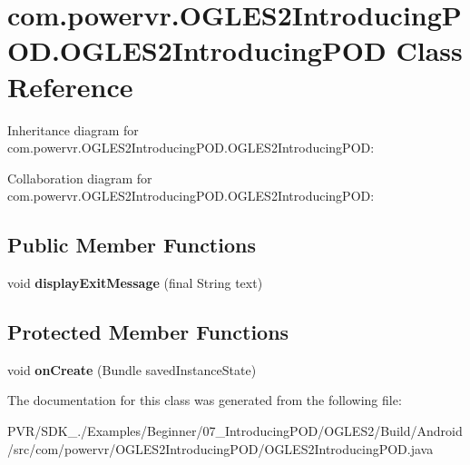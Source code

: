 \hypertarget{classcom_1_1powervr_1_1_o_g_l_e_s2_introducing_p_o_d_1_1_o_g_l_e_s2_introducing_p_o_d}{\section{com.\+powervr.\+O\+G\+L\+E\+S2\+Introducing\+P\+O\+D.\+O\+G\+L\+E\+S2\+Introducing\+P\+O\+D Class Reference}
\label{classcom_1_1powervr_1_1_o_g_l_e_s2_introducing_p_o_d_1_1_o_g_l_e_s2_introducing_p_o_d}
}


Inheritance diagram for com.\+powervr.\+O\+G\+L\+E\+S2\+Introducing\+P\+O\+D.\+O\+G\+L\+E\+S2\+Introducing\+P\+O\+D\+:


Collaboration diagram for com.\+powervr.\+O\+G\+L\+E\+S2\+Introducing\+P\+O\+D.\+O\+G\+L\+E\+S2\+Introducing\+P\+O\+D\+:
\subsection*{Public Member Functions}
\begin{DoxyCompactItemize}
\item 
\hypertarget{classcom_1_1powervr_1_1_o_g_l_e_s2_introducing_p_o_d_1_1_o_g_l_e_s2_introducing_p_o_d_ae4e452ec00b98bf7b152ed6df6b00767}{void {\bfseries display\+Exit\+Message} (final String text)}\label{classcom_1_1powervr_1_1_o_g_l_e_s2_introducing_p_o_d_1_1_o_g_l_e_s2_introducing_p_o_d_ae4e452ec00b98bf7b152ed6df6b00767}

\end{DoxyCompactItemize}
\subsection*{Protected Member Functions}
\begin{DoxyCompactItemize}
\item 
\hypertarget{classcom_1_1powervr_1_1_o_g_l_e_s2_introducing_p_o_d_1_1_o_g_l_e_s2_introducing_p_o_d_a678d8586ca9cb33fcc3e2ef07f03a50f}{void {\bfseries on\+Create} (Bundle saved\+Instance\+State)}\label{classcom_1_1powervr_1_1_o_g_l_e_s2_introducing_p_o_d_1_1_o_g_l_e_s2_introducing_p_o_d_a678d8586ca9cb33fcc3e2ef07f03a50f}

\end{DoxyCompactItemize}


The documentation for this class was generated from the following file\+:\begin{DoxyCompactItemize}
\item 
P\+V\+R/\+S\+D\+K\+\_./\+Examples/\+Beginner/07\+\_\+\+Introducing\+P\+O\+D/\+O\+G\+L\+E\+S2/\+Build/\+Android/src/com/powervr/\+O\+G\+L\+E\+S2\+Introducing\+P\+O\+D/O\+G\+L\+E\+S2\+Introducing\+P\+O\+D.\+java\end{DoxyCompactItemize}
